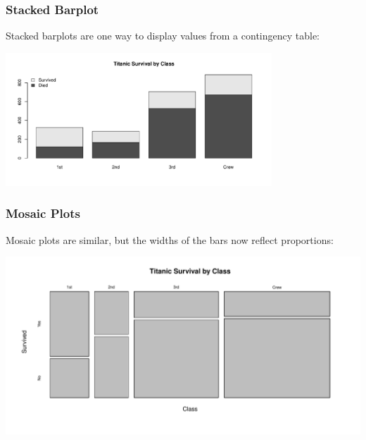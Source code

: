 \documentclass[handout]{beamer}
\newcommand{\blue}[1]{\textcolor{blue2}{#1}}
\begin{document}
\begin{frame}[fragile]
\frametitle{Stacked Barplot}
\blue{Stacked barplots} are one way to display values from a contingency table:

\begin{center}
\includegraphics[width=10cm]{figure/barplot2.pdf}
\end{center}

\end{frame}


%
%


\begin{frame}[fragile]
\frametitle{Mosaic Plots}
\blue{Mosaic plots} are similar, but the widths of the bars now reflect proportions:

\begin{center}
\includegraphics[width=\textwidth]{figure/mosaic_plot.pdf}
\end{center}

\end{frame}
\end{document}
